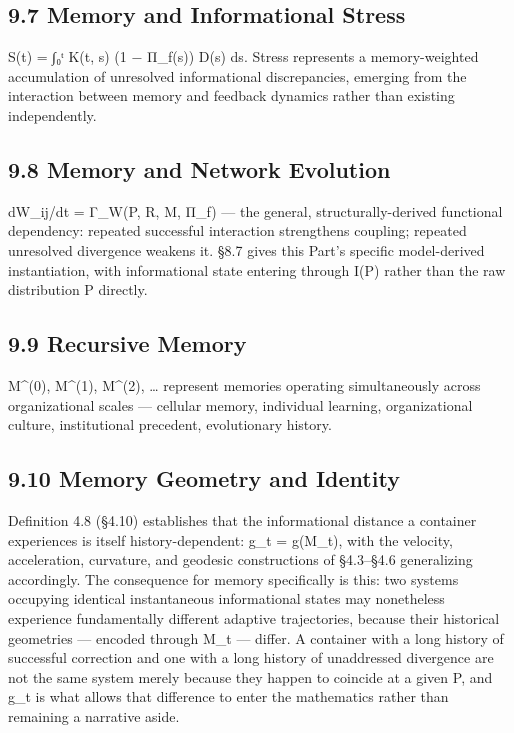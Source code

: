 \documentclass[
]{article}
\begin{document}
\hypertarget{memory-and-informational-stress}{%
\subsection{9.7 Memory and Informational
Stress}\label{memory-and-informational-stress}}

S(t) = ∫₀ᵗ K(t, s) (1 − Π\_f(s)) D(s) ds. Stress represents a
memory-weighted accumulation of unresolved informational discrepancies,
emerging from the interaction between memory and feedback dynamics
rather than existing independently.

\hypertarget{memory-and-network-evolution}{%
\subsection{9.8 Memory and Network
Evolution}\label{memory-and-network-evolution}}

dW\_ij/dt = Γ\_W(P, R, M, Π\_f) --- the general, structurally-derived
functional dependency: repeated successful interaction strengthens
coupling; repeated unresolved divergence weakens it. §8.7 gives this
Part's specific model-derived instantiation, with informational state
entering through I(P) rather than the raw distribution P directly.

\hypertarget{recursive-memory}{%
\subsection{9.9 Recursive Memory}\label{recursive-memory}}

M\^{}(0), M\^{}(1), M\^{}(2), \ldots{} represent memories operating
simultaneously across organizational scales --- cellular memory,
individual learning, organizational culture, institutional precedent,
evolutionary history.

\hypertarget{memory-geometry-and-identity}{%
\subsection{9.10 Memory Geometry and
Identity}\label{memory-geometry-and-identity}}

Definition 4.8 (§4.10) establishes that the informational distance a
container experiences is itself history-dependent: g\_t = g(M\_t), with
the velocity, acceleration, curvature, and geodesic constructions of
§4.3--§4.6 generalizing accordingly. The consequence for memory
specifically is this: two systems occupying identical instantaneous
informational states may nonetheless experience fundamentally different
adaptive trajectories, because their historical geometries --- encoded
through M\_t --- differ. A container with a long history of successful
correction and one with a long history of unaddressed divergence are not
the same system merely because they happen to coincide at a given P, and
g\_t is what allows that difference to enter the mathematics rather than
remaining a narrative aside.
\end{document}
